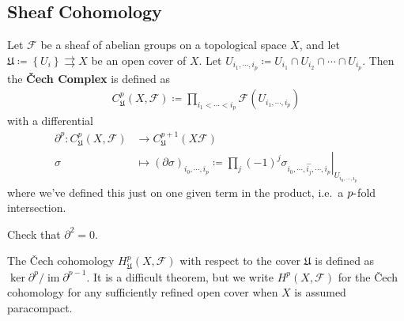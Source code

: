 \hypertarget{sheaf-cohomology}{%
\subsection{Sheaf Cohomology}\label{sheaf-cohomology}}

\begin{definition}[?]

Let \(\mathcal{F}\) be a sheaf of abelian groups on a topological space
\(X\), and let
\(\mathfrak{U} \coloneqq\left\{{U_i}\right\} \rightrightarrows X\) be an
open cover of \(X\). Let
\(U_{i_1, \cdots, i_p} \coloneqq U_{i_1} \cap U_{i_2} \cap\cdots \cap U_{i_p}\).
Then the \textbf{Čech Complex} is defined as
\begin{align*}
C_{\mathfrak{U}}^p(X, \mathcal{F}) \coloneqq\prod_{i_1 < \cdots < i_p} \mathcal{F}(U_{i_1, \cdots, i_p})   
\end{align*}
with a differential
\begin{align*}
{{\partial}}^p: C_{\mathfrak{U}}^p(X, \mathcal{F}) &\to C_{\mathfrak{U}}^{p+1}(X \mathcal{F}) \\
\sigma &\mapsto ({{\partial}}\sigma)_{i_0, \cdots, i_p} \coloneqq\prod_j (-1)^j { \left.{{\sigma_{i_0, \cdots, \widehat{i_j}, \cdots, i_p}}} \right|_{{U_{i_0, \cdots, i_p}}} }
\end{align*}
where we've defined this just on one given term in the product, i.e.~a
\(p{\hbox{-}}\)fold intersection.

\end{definition}

\begin{exercise}[?]

Check that \({{\partial}}^2 = 0\).

\end{exercise}

\begin{remark}

The Čech cohomology \(H^p_{\mathfrak{U}}(X, \mathcal{F})\) with respect
to the cover \(\mathfrak{U}\) is defined as
\(\ker {{\partial}}^p/\operatorname{im}{{\partial}}^{p-1}\). It is a
difficult theorem, but we write \(H^p(X, \mathcal{F})\) for the Čech
cohomology for any sufficiently refined open cover when \(X\) is assumed
paracompact.

\end{remark}

